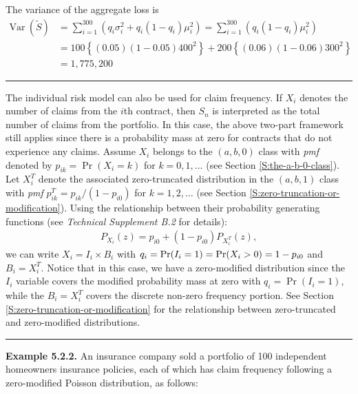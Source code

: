 \documentclass[]{book}
\theoremstyle{definition}
\theoremstyle{definition}
\theoremstyle{definition}
\theoremstyle{remark}
\begin{document}
The variance of the aggregate loss is \[\begin{aligned}
\mathrm{Var~}(\tilde{S}) &= \sum_{i=1}^{300} \left( q_i \sigma _i^2+q_i (1-q_i
)\mu_i^2 \right) = \sum_{i=1}^{300} \left( q_i (1-q_i) \mu_i^2 \right) \\
&= 100 \left\{(0.05) (1-0.05) 400^2\right\} +
200 \left\{(0.06) (1-0.06)300^2\right\} \\
&= 1,775,200
\end{aligned}\]

\begin{center}\rule{0.5\linewidth}{\linethickness}\end{center}

The individual risk model can also be used for claim frequency. If
\(X_i\) denotes the number of claims from the \(i\)th contract, then
\(S_n\) is interpreted as the total number of claims from the portfolio.
In this case, the above two-part framework still applies since there is
a probability mass at zero for contracts that do not experience any
claims. Assume \(X_i\) belongs to the \((a,b,0)\) class with \emph{pmf}
denoted by \(p_{ik} = \Pr(X_i=k)\) for \(k=0,1,\ldots\) (see Section
\ref{S:the-a-b-0-class}). Let \(X_i^{T}\) denote the associated
zero-truncated distribution in the \((a,b,1)\) class with \emph{pmf}
\(p_{ik}^T=p_{ik}/(1-p_{i0})\) for \(k=1,2,\ldots\) (see Section
\ref{S:zero-truncation-or-modification}). Using the relationship between
their probability generating functions (see \emph{Technical Supplement
B.2} for details): \[\begin{aligned}
P_{X_i}(z) = p_{i0} +(1-p_{i0}) P_{X_i^{T}}(z),
\end{aligned}\] we can write \(X_i=I_i\times B_i\) with
\(q_i={\rm Pr}(I_i=1)={\rm Pr}(X_i>0)=1-p_{i0}\) and \(B_i=X_i^T\).
Notice that in this case, we have a zero-modified distribution since the
\(I_i\) variable covers the modified probability mass at zero with
\(q_i = \Pr(I_i=1)\), while the \(B_i=X_i^T\) covers the discrete
non-zero frequency portion. See Section
\ref{S:zero-truncation-or-modification} for the relationship between
zero-truncated and zero-modified distributions.

\begin{center}\rule{0.5\linewidth}{\linethickness}\end{center}

\textbf{Example 5.2.2.} An insurance company sold a portfolio of 100
independent homeowners insurance policies, each of which has claim
frequency following a zero-modified Poisson distribution, as follows:
\end{document}
